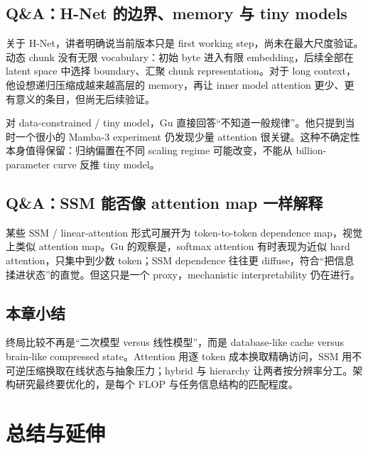 \documentclass[a4paper]{article}
\begin{document}
\subsection{Q\&A：H-Net 的边界、memory 与 tiny models}

关于 H-Net，讲者明确说当前版本只是 first working step，尚未在最大尺度验证。动态 chunk 没有无限 vocabulary：初始 byte 进入有限 embedding，后续全部在 latent space 中选择 boundary、汇聚 chunk representation。对于 long context，他设想递归压缩成越来越高层的 memory，再让 inner model attention 更少、更有意义的条目，但尚无后续验证。


对 data-constrained / tiny model，Gu 直接回答“不知道一般规律”。他只提到当时一个很小的 Mamba-3 experiment 仍发现少量 attention 很关键。这种不确定性本身值得保留：归纳偏置在不同 scaling regime 可能改变，不能从 billion-parameter curve 反推 tiny model。

\subsection{Q\&A：SSM 能否像 attention map 一样解释}

某些 SSM / linear-attention 形式可展开为 token-to-token dependence map，视觉上类似 attention map。Gu 的观察是，softmax attention 有时表现为近似 hard attention，只集中到少数 token；SSM dependence 往往更 diffuse，符合“把信息揉进状态”的直觉。但这只是一个 proxy，mechanistic interpretability 仍在进行。


\subsection{本章小结}

终局比较不再是“二次模型 versus 线性模型”，而是 database-like cache versus brain-like compressed state。Attention 用逐 token 成本换取精确访问，SSM 用不可逆压缩换取在线状态与抽象压力；hybrid 与 hierarchy 让两者按分辨率分工。架构研究最终要优化的，是每个 FLOP 与任务信息结构的匹配程度。

\section{总结与延伸}
\end{document}
